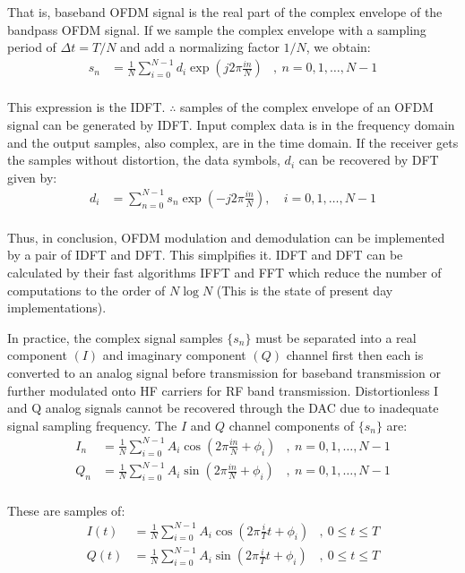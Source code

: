 That is, baseband OFDM signal is the real part of the complex envelope of the bandpass OFDM signal. If we sample the complex envelope with a sampling period of $\Delta t = T/N$ and add a normalizing factor $1/N$, we obtain:
\begin{align*}
s_n &= \frac{1}{N}\sum_{i=0}^{N-1}d_i\exp\left( j2\pi\frac{in}{N}\right)&,\ n = 0,1,\ldots,N-1\\
\end{align*}

This expression is the \gls{IDFT}. $\therefore$ samples of the complex envelope of an OFDM signal can be generated by \gls{IDFT}\cite{fuqin}. Input complex data is in the frequency domain and the output samples, also complex, are in the time domain. If the receiver gets the samples without distortion, the data symbols, $d_i$ can be recovered by \gls{DFT}\cite{ofdm_intro} given by:
\begin{align*}
d_i &= \sum_{n=0}^{N-1}s_n\exp\left( -j2\pi\frac{in}{N}\right),&\ i=0,1,\ldots,N-1\\
\end{align*}

Thus, in conclusion, OFDM modulation and demodulation can be implemented by a pair of \gls{IDFT} and \gls{DFT}. This simplpifies it. IDFT and DFT can be calculated by their fast algorithms \gls{IFFT} and \gls{FFT} which reduce the number of computations to the order of $N\log N$\cite{ofdm_intro} (This is the state of present day implementations).

In practice, the complex signal samples $\{s_n\}$ must be separated into a real component $(I)$ and imaginary component $(Q)$ channel first then each is converted to an analog signal before transmission for baseband transmission or further modulated onto HF carriers for RF band transmission. Distortionless I and Q analog signals cannot be recovered through the DAC due to inadequate signal sampling frequency. The $I$ and $Q$ channel components of $\{ s_n\}$ are:
\begin{align*}
I_n &= \frac{1}{N}\sum_{i=0}^{N-1}A_i\cos\left( 2\pi\frac{in}{N}+\phi_i\right)&,\ n=0,1,\ldots,N-1\\
Q_n &= \frac{1}{N}\sum_{i=0}^{N-1}A_i\sin\left( 2\pi\frac{in}{N}+\phi_i\right)&,\ n=0,1,\ldots,N-1\\
\end{align*}

\noindent These are samples of:
\begin{align*}
I(t) &= \frac{1}{N}\sum_{i=0}^{N-1}A_i\cos\left( 2\pi\frac{i}{T}t+\phi_i\right)&,\ 0\leq t\leq T\\
Q(t) &= \frac{1}{N}\sum_{i=0}^{N-1}A_i\sin\left( 2\pi\frac{i}{T}t+\phi_i\right)&,\ 0\leq t\leq T\\
\end{align*}

